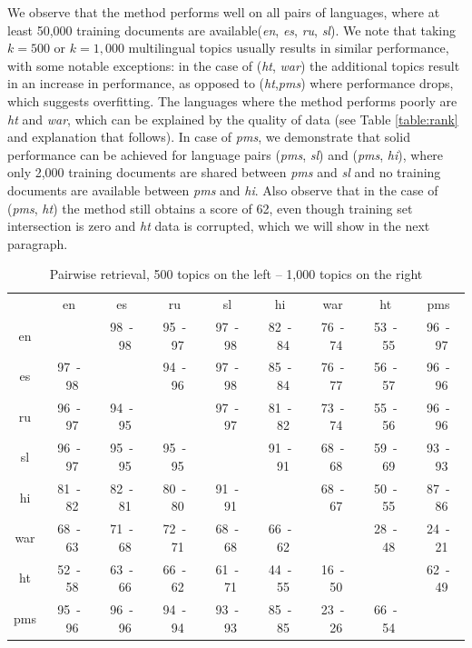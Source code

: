\documentclass[twoside,11pt]{article}
\begin{document}
We observe that the method performs well on all pairs of languages, where at least 50,000 training documents are available(\emph{en}, \emph{es}, \emph{ru}, \emph{sl}). We note that taking $k = 500$ or $k = 1,000$ multilingual topics usually results in similar performance, with some notable exceptions: in the case of (\emph{ht}, \emph{war}) the additional topics result in an increase in performance, as opposed to (\emph{ht},\emph{pms}) where performance drops, which suggests overfitting. The languages where the method performs poorly are \emph{ht} and \emph{war}, which can be explained by the quality of data (see Table \ref{table:rank} and explanation that follows). In case of \emph{pms}, we demonstrate that solid performance can be achieved for language pairs (\emph{pms}, \emph{sl}) and (\emph{pms}, \emph{hi}), where only 2,000 training documents are shared between \emph{pms} and \emph{sl} and no training documents are available between \emph{pms} and \emph{hi}. Also observe that in the case of (\emph{pms}, \emph{ht}) the method still obtains a score of 62, even though training set intersection is zero and \emph{ht} data is corrupted, which we will show in the next paragraph.
{
\renewcommand\tabcolsep{3pt}
\begin{table}[h!]
\caption{Pairwise retrieval, 500 topics on the left -- 1,000 topics on the right}\label{table:retrieval}
\begin{center}
\begin{tabular}{|c|c|c|c|c|c|c|c|c|}
\cline{1-9}
&	en&	es&	ru&	sl&	hi&	war&	ht&	pms\\\cline{1-9}
en&	    &	98~-~98&	95~-~97&	97~-~98&	82~-~84&	76~-~74&	53~-~55&	 96~-~97\\
\cline{1-9}
es&	97~-~98&	&	94~-~96&	97~-~98&	85~-~84&	76~-~77&	56~-~57&	96~-~96\\
\cline{1-9}
ru&	96~-~97&	94~-~95&	&	97~-~97&	81~-~82&	73~-~74&	55~-~56&	96~-~96\\
\cline{1-9}
sl&	96~-~97&	95~-~95&	95~-~95&	&	91~-~91&	68~-~68&	59~-~69&	93~-~93\\
\cline{1-9}
hi&	81~-~82&	82~-~81&	80~-~80&	91~-~91&	&	68~-~67&	50~-~55&	87~-~86\\
\cline{1-9}
war&	68~-~63&	71~-~68&	72~-~71&	68~-~68&	66~-~62&	&	28~-~48&	 24~-~21\\
\cline{1-9}
ht&	52~-~58&	63~-~66&	66~-~62&	61~-~71&	44~-~55&	16~-~50&	&	62~-~49\\
\cline{1-9}
pms&	95~-~96&	96~-~96&	94~-~94&	93~-~93&	85~-~85&	23~-~26&	66~-~54&	 \\
\cline{1-9}
\end{tabular}
\end{center}
\end{table}
}
\end{document}
